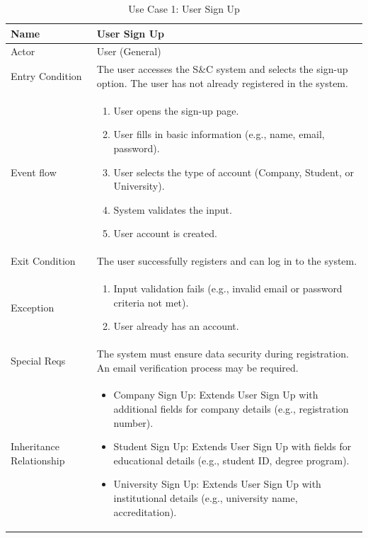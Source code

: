 \begin{table}[H]
\centering
\begin{tabular}{|l|p{12cm}|}
\hline
Name             & User Sign Up \\ \hline
Actor            & User (General) \\ \hline
Entry Condition  & 
The user accesses the S\&C system and selects the sign-up option. The user has not already registered in the system. \\ \hline
Event flow       & 
\begin{enumerate}
    \item User opens the sign-up page.
    \item User fills in basic information (e.g., name, email, password).
    \item User selects the type of account (Company, Student, or University).
    \item System validates the input.
    \item User account is created.
\end{enumerate} \\ \hline
Exit Condition   & The user successfully registers and can log in to the system. \\ \hline
Exception        & 
\begin{enumerate}
    \item Input validation fails (e.g., invalid email or password criteria not met).
\item User already has an account.
\end{enumerate} \\ \hline
Special Reqs     & The system must ensure data security during registration. An email verification process may be required. \\ \hline
Inheritance Relationship & 
\begin{itemize}
    \item Company Sign Up: Extends User Sign Up with additional fields for company details (e.g., registration number).
    \item Student Sign Up: Extends User Sign Up with fields for educational details (e.g., student ID, degree program).
    \item University Sign Up: Extends User Sign Up with institutional details (e.g., university name, accreditation). 
\end{itemize} \\ \hline
\end{tabular}
\caption{Use Case 1: User Sign Up}
\label{tab:user_signup}
\end{table}

